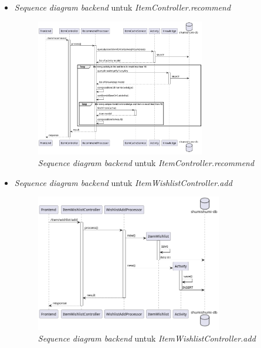 \documentclass[a4paper]{article}
\begin{document}
\begin{enumerate}
\begin{enumerate}
\begin{itemize}
            \newpage
            \item \textit{Sequence diagram backend} untuk \textit{ItemController.recommend}
            \begin{figure}[h]
                \centering
                \includegraphics*[height=6cm]{diagram/sequence diagram/BE/item controller/recommend/recommend.png}
                \caption{\textit{Sequence diagram backend} untuk \textit{ItemController.recommend}}
            \end{figure}

            \item \textit{Sequence diagram backend} untuk \textit{ItemWishlistController.add}
            \begin{figure}[h]
                \centering
                \includegraphics*[height=6cm]{diagram/sequence diagram/BE/Item Wishlist Controller/add/add.png}
                \caption{\textit{Sequence diagram backend} untuk \textit{ItemWishlistController.add}}
            \end{figure}


\end{itemize}
\end{enumerate}
\end{enumerate}
\end{document}
